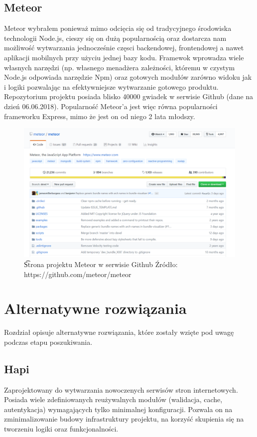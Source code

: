 \documentclass[12pt]{report}
\begin{document}
    \subsection{Meteor}
      Meteor wybrałem ponieważ mimo odcięcia się od tradycyjnego środowiska technologii Node.js, cieszy się on dużą popularnością oraz dostarcza nam możliwość wytwarzania jednocześnie częsci backendowej, frontendowej a nawet aplikacji mobilnych przy użyciu jednej bazy kodu.
      Framewok wprowadza wiele własnych narzędzi (np. własnego menadżera zależności, któremu w czystym Node.js odpowiada narzędzie Npm) oraz gotowych modułów zarówno widoku jak i logiki pozwalając na efektywniejsze wytwarzanie gotowego produktu.
      Repozytorium projektu posiada blisko 40000 gwiadek w serwisie Github (dane na dzień 06.06.2018).
      Popularność Meteor'a jest więc równa popularności frameworku Express, mimo że jest on od niego 2 lata młodszy.
      \begin{figure}[!hb]
        \centering
        \includegraphics[width=\textwidth,height=\textheight,keepaspectratio]{meteor.png} 
        \caption{\t Strona projektu Meteor w serwisie Github \newline Źródło: https://github.com/meteor/meteor}
      \end{figure}
  
  \pagebreak
  \section{Alternatywne rozwiązania}
    Rozdział opisuje alternatywne rozwiązania, które zostały wzięte pod uwagę podczas etapu poszukiwania.

    \subsection{Hapi}
    Zaprojektowany do wytwarzania nowoczenych serwisów stron internetowych.
    Posiada wiele zdefiniowanych reużywalnych modułów (walidacja, cache, autentykacja) wymagających tylko minimalnej konfiguracji.
    Pozwala on na zminimalizowanie budowy infrastruktury projektu, na korzyść skupienia się na tworzeniu logiki oraz funkcjonalności.
\end{document}
